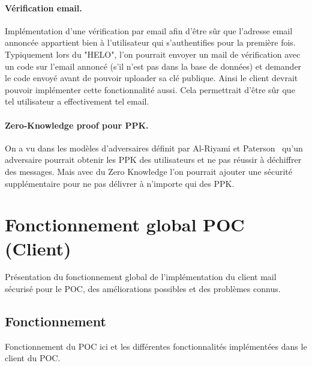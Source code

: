 \paragraph*{Vérification email.}
Implémentation d'une vérification par email afin d'être sûr que l'adresse email annoncée appartient bien à l'utilisateur qui s'authentifies pour la première fois. Typiquement lors du "HELO", l'on pourrait envoyer un mail de vérification avec un code sur l'email annoncé (s'il n'est pas dans la base de données) et demander le code envoyé avant de pouvoir uploader sa clé publique. Ainsi le client devrait pouvoir implémenter cette fonctionnalité aussi. Cela permettrait d'être sûr que tel utilisateur a effectivement tel email.
\paragraph*{Zero-Knowledge proof pour PPK.}
On a vu dans les modèles d'adversaires définit par Al-Riyami et Paterson~\cite{DBLP:conf/asiacrypt/Al-RiyamiP03} qu'un adversaire pourrait obtenir les PPK des utilisateurs et ne pas réussir à déchiffrer des messages. Mais avec du Zero Knowledge l'on pourrait ajouter une sécurité supplémentaire pour ne pas délivrer à n'importe qui des PPK.
\section{Fonctionnement global POC (Client)}
Présentation du fonctionnement global de l'implémentation du client mail sécurisé pour le POC, des améliorations possibles et des problèmes connus.
\subsection{Fonctionnement}
Fonctionnement du POC ici et les différentes fonctionnalités implémentées dans le client du POC.
